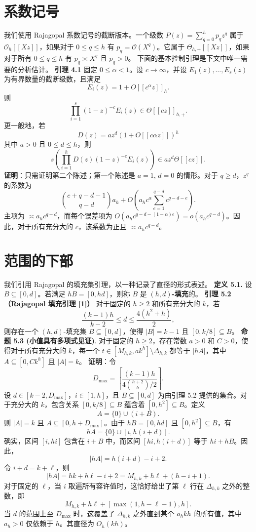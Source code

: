 \documentclass[11pt]{article}
\theoremstyle{break}
\begin{document}
\section{系数记号}
我们使用 Rajagopal 系数记号的截断版本。一个级数 $P(z) = \sum_{q=0}^h p_q z^q$ 属于 $\mathcal{O}_h[[Xz]]$，如果对于 $0 \leq q \leq h$ 有 $p_q = \mathcal{O}(X^q)$。它属于 $\Theta_{h,+}[[Xz]]$，如果对于所有 $0 \leq q \leq h$ 有 $p_q \asymp X^q$ 且 $p_q > 0$。
下面的基本控制引理是下文中唯一需要的分析估计。
\textbf{引理 4.1} 固定 $0 \le \alpha < 1$。设 $c \to \infty$，并设 $E_1(z), \dots, E_s(z)$ 为有界数量的截断级数，且满足
\[
E_i(z) = 1 + O[\![c^\alpha z]\!]_{h}.
\]
则
\[
\prod_{i=1}^{s} (1-z)^{-c} E_i(z) \in \Theta[\![c z]\!]_{h,+}.
\]
更一般地，若
\[
D(z) = a z^d (1 + O[[c \alpha z]])^h
\]
其中 \(a > 0\) 且 \(0 \leq d \leq h\)，则
\[
s \left( \prod_{i=1}^{h} D(z) (1-z)^{-c} E_i(z) \right) \in a z^d \Theta [[c z]].
\]
\textbf{证明}：只需证明第二个陈述；第一个陈述是 $a = 1$, $d = 0$ 的情形。对于 $q \ge d$，$z^q$ 的系数为
\[
\binom{c + q - d - 1}{q - d} a_h + O \left( a_h c^\alpha \sum_{e=1}^{q-d} c^{q-d-e} \right).
\]
主项为 $\asymp a_h c^{q-d}$，而每个误差项为 $O \left( a_h c^{q-d-(1-\alpha)e} \right) = o \left( a_h c^{q-d} \right)$。因此，对于所有充分大的 $c$，该系数为正且 $\asymp a_h c^{q-d}$。
\section{范围的下部}

我们引用 Rajagopal 的填充集引理，以一种记录了直径的形式表述。
\textbf{定义 5.1.} 设 $B \subseteq [0,d]$。若满足 $hB = [0,hd]$，则称 $B$ 是 \textbf{$(h,d)$-填充}的。
\textbf{引理 5.2（Rajagopal 填充引理 [1]）}  
对于固定的 $h \geq 2$ 和所有充分大的 $k$，若
\[
\frac{(k-1)h}{k-2} \leq d \leq \frac{4(h^2+h)}{2},
\]
则存在一个 $(h,d)$-填充集 $B \subseteq [0,d]$，使得 $|B| = k-1$ 且 $[0, k/8] \subseteq B$。
\textbf{命题 5.3 (小值具有多项式见证)}. 对于固定的 $h \geq 2$，存在常数 $a > 0$ 和 $C > 0$，使得对于所有充分大的 $k$，每一个
$t \in [M_{h,k}, a k^h] \setminus \Delta_{h,k}$
都等于 $|hA|$，其中 $A \subseteq [0, C k^h]$ 且 $|A| = k$。
\textbf{证明}：令 \[ D_{\max} = \left\lceil \frac{(k-1)h}{4 \binom{h+2}{h} / 2} \right\rceil. \] 设 $d \in [k-2, D_{\max}]$，$i \in [1, h]$，且 $B \subseteq [0, d]$ 为由引理 5.2 提供的集合。对于充分大的 $k$，包含关系 $[0, k/8] \subseteq B$ 蕴含着 $[0, h^2] \subseteq B$。定义 \[ A = \{0\} \cup (i + B). \] 则 $|A| = k$ 且 $A \subseteq [0, h + D_{\max}]$。由于 $hB = [0, hd]$ 且 $[0, h^2] \subseteq B$，有 \[ hA = \{0\} \cup [i, h(i+d)]. \]
确实，区间 $[i, hi]$ 包含在 $i + B$ 中，而区间 $[hi, h(i+d)]$ 等于 $hi + hB$。因此，
\[
|hA| = h(i+d) - i + 2.
\]
令 $i+d = k + \ell$，则
\[
|hA| = hk + h\ell - i + 2 = M_{h,k} + h\ell + (h - i + 1).
\]
对于固定的 $\ell$，当 $i$ 取遍所有容许值时，这恰好给出了第 $\ell$ 行在 $\Delta_{h,k}$ 之外的整数，即
\[
M_{h,k} + h\ell + [\max(1, h-\ell-1), h].
\]
当 $d$ 的范围上至 $D_{\max}$ 时，这覆盖了 $\Delta_{h,k}$ 之外直到某个 $a_h kh$ 的所有值，其中 $a_h > 0$ 仅依赖于 $h$。其直径为 $O_h(kh)$。
\end{document}
